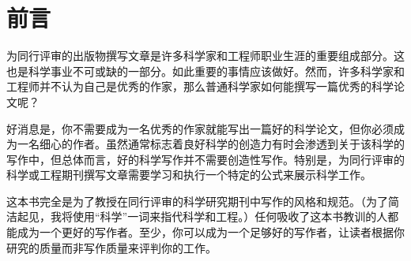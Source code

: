 
\newcommand{\myfootnote}[1]{
{\noindent\rule{5cm}{0.4pt}}\\
{\setlength\parindent{0pt}#1}
}

\section*{前言}

为同行评审的出版物撰写文章是许多科学家和工程师职业生涯的重要组成部分。这也是科学事业不可或缺的一部分。如此重要的事情应该做好。然而，许多科学家和工程师并不认为自己是优秀的作家，那么普通科学家如何能撰写一篇优秀的科学论文呢？

好消息是，你不需要成为一名优秀的作家就能写出一篇好的科学论文，但你必须成为一名细心的作者。虽然通常标志着良好科学的创造力有时会渗透到关于该科学的写作中，但总体而言，好的科学写作并不需要创造性写作。特别是，为同行评审的科学或工程期刊撰写文章需要学习和执行一个特定的公式来展示科学工作。

这本书完全是为了教授在同行评审的科学研究期刊中写作的风格和规范。（为了简洁起见，我将使用“科学”一词来指代科学和工程。）任何吸收了这本书教训的人都能成为一个更好的写作者。至少，你可以成为一个足够好的写作者，让读者根据你研究的质量而非写作质量来评判你的工作。


